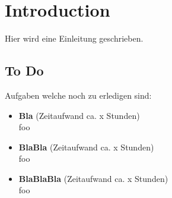 \section*{Introduction}
Hier wird eine Einleitung geschrieben.

\subsection*{To Do}
Aufgaben welche noch zu erledigen sind:
\begin{itemize}
	\item \textbf{Bla} (Zeitaufwand ca. x Stunden)\\
	foo
	\item \textbf{BlaBla} (Zeitaufwand ca. x Stunden)\\
	foo
	\item \textbf{BlaBlaBla} (Zeitaufwand ca. x Stunden)\\
	foo
\end{itemize}